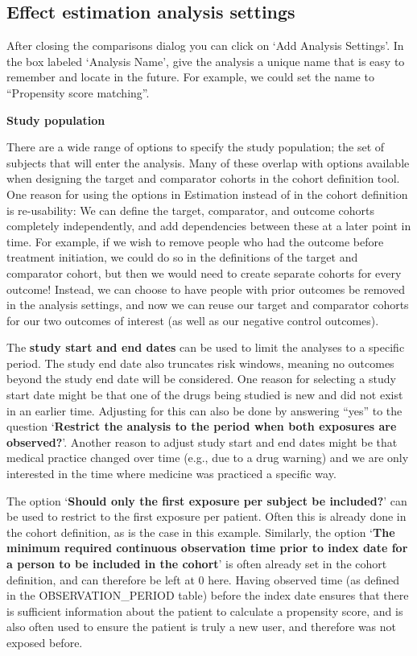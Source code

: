 \documentclass[]{book}
\begin{document}
\subsection{Effect estimation analysis
settings}\label{effect-estimation-analysis-settings}

After closing the comparisons dialog you can click on `Add Analysis
Settings'. In the box labeled `Analysis Name', give the analysis a
unique name that is easy to remember and locate in the future. For
example, we could set the name to ``Propensity score matching''.

\textbf{Study population}

There are a wide range of options to specify the study population; the
set of subjects that will enter the analysis. Many of these overlap with
options available when designing the target and comparator cohorts in
the cohort definition tool. One reason for using the options in
Estimation instead of in the cohort definition is re-usability: We can
define the target, comparator, and outcome cohorts completely
independently, and add dependencies between these at a later point in
time. For example, if we wish to remove people who had the outcome
before treatment initiation, we could do so in the definitions of the
target and comparator cohort, but then we would need to create separate
cohorts for every outcome! Instead, we can choose to have people with
prior outcomes be removed in the analysis settings, and now we can reuse
our target and comparator cohorts for our two outcomes of interest (as
well as our negative control outcomes).

The \textbf{study start and end dates} can be used to limit the analyses
to a specific period. The study end date also truncates risk windows,
meaning no outcomes beyond the study end date will be considered. One
reason for selecting a study start date might be that one of the drugs
being studied is new and did not exist in an earlier time. Adjusting for
this can also be done by answering ``yes'' to the question
`\textbf{Restrict the analysis to the period when both exposures are
observed?}'. Another reason to adjust study start and end dates might be
that medical practice changed over time (e.g., due to a drug warning)
and we are only interested in the time where medicine was practiced a
specific way.

The option `\textbf{Should only the first exposure per subject be
included?}' can be used to restrict to the first exposure per patient.
Often this is already done in the cohort definition, as is the case in
this example. Similarly, the option `\textbf{The minimum required
continuous observation time prior to index date for a person to be
included in the cohort}' is often already set in the cohort definition,
and can therefore be left at 0 here. Having observed time (as defined in
the OBSERVATION\_PERIOD table) before the index date ensures that there
is sufficient information about the patient to calculate a propensity
score, and is also often used to ensure the patient is truly a new user,
and therefore was not exposed before.
\end{document}
